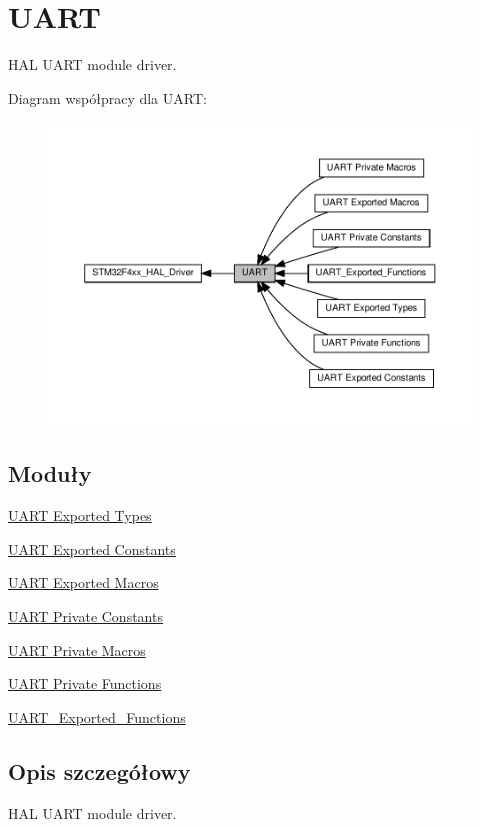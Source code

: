 \hypertarget{group___u_a_r_t}{}\section{U\+A\+RT}
\label{group___u_a_r_t}


H\+AL U\+A\+RT module driver.  


Diagram współpracy dla U\+A\+RT\+:\nopagebreak
\begin{figure}[H]
\begin{center}
\leavevmode
\includegraphics[width=350pt]{group___u_a_r_t}
\end{center}
\end{figure}
\subsection*{Moduły}
\begin{DoxyCompactItemize}
\item 
\hyperlink{group___u_a_r_t___exported___types}{U\+A\+R\+T Exported Types}
\item 
\hyperlink{group___u_a_r_t___exported___constants}{U\+A\+R\+T Exported Constants}
\item 
\hyperlink{group___u_a_r_t___exported___macros}{U\+A\+R\+T Exported Macros}
\item 
\hyperlink{group___u_a_r_t___private___constants}{U\+A\+R\+T Private Constants}
\item 
\hyperlink{group___u_a_r_t___private___macros}{U\+A\+R\+T Private Macros}
\item 
\hyperlink{group___u_a_r_t___private___functions}{U\+A\+R\+T Private Functions}
\item 
\hyperlink{group___u_a_r_t___exported___functions}{U\+A\+R\+T\+\_\+\+Exported\+\_\+\+Functions}
\end{DoxyCompactItemize}


\subsection{Opis szczegółowy}
H\+AL U\+A\+RT module driver. 

